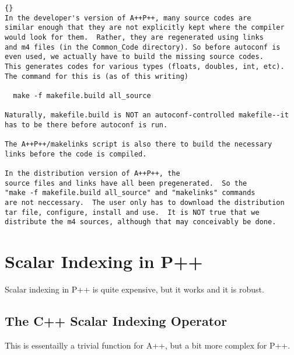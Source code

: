 \documentclass[10pt]{llncs}
\begin{document}
\begin{lstlisting}{}
In the developer's version of A++P++, many source codes are
similar enough that they are not explicitly kept where the compiler
would look for them.  Rather, they are regenerated using links
and m4 files (in the Common_Code directory). So before autoconf is
even used, we actually have to build the missing source codes.
This generates codes for various types (floats, doubles, int, etc).
The command for this is (as of this writing)

  make -f makefile.build all_source

Naturally, makefile.build is NOT an autoconf-controlled makefile--it
has to be there before autoconf is run.

The A++P++/makelinks script is also there to build the necessary
links before the code is compiled.

In the distribution version of A++P++, the
source files and links have all been pregenerated.  So the
"make -f makefile.build all_source" and "makelinks" commands
are not neccessary.  The user only has to download the distribution
tar file, configure, install and use.  It is NOT true that we
distribute the m4 sources, although that may conceivably be done.

\end{lstlisting}


\newpage
\section{Scalar Indexing in P++}
   Scalar indexing in P++ is quite expensive, but it works and it is robust.

\subsection{The C++ Scalar Indexing Operator}
   This is essentailly a trivial function for A++, but a bit more complex for P++.

\vspace{0.5in}
\end{document}
